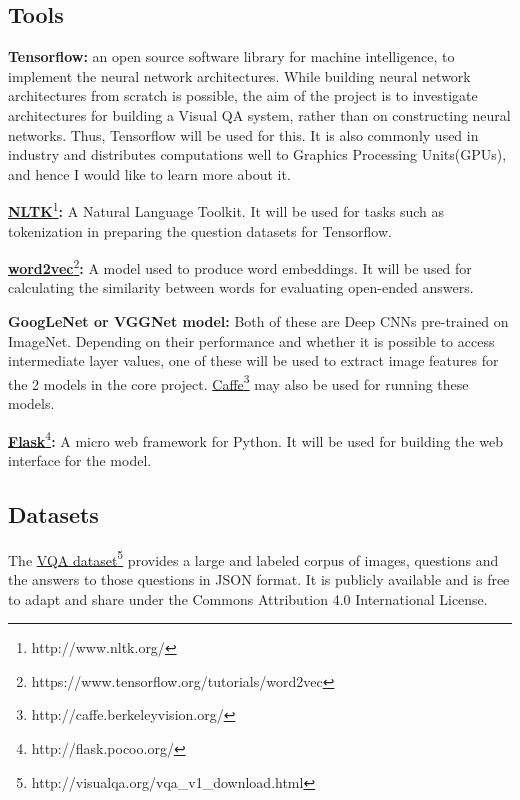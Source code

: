 \documentclass[12pt,a4paper,twoside]{article}
\begin{document}
\setlength{\parskip}{1em}

\subsection{Tools}\label{Tools}

\textbf{Tensorflow:} an open source software library for machine intelligence, to implement the neural network architectures. While building neural network architectures from scratch is possible, the aim of the project is to investigate architectures for building a Visual QA system, rather than on constructing neural networks. Thus, Tensorflow will be used for this. It is also commonly used in industry and distributes computations well to Graphics Processing Units(GPUs), and hence I would like to learn more about it. 

\href{http://www.nltk.org/}{\textbf{NLTK}}\footnote{http://www.nltk.org/}\textbf{:} A Natural Language Toolkit. It will be used for tasks such as tokenization in preparing the question datasets for Tensorflow.

\href{https://www.tensorflow.org/tutorials/word2vec}{\textbf{word2vec}}\footnote{https://www.tensorflow.org/tutorials/word2vec}\textbf{:} A model used to produce word embeddings. It will be used for calculating the similarity between words for evaluating open-ended answers.

\textbf{GoogLeNet or VGGNet model:} Both of these are Deep CNNs pre-trained on ImageNet\cite{CNN}. Depending on their performance and whether it is possible to access intermediate layer values, one of these will be used to extract image features for the 2 models in the core project. \href{http://caffe.berkeleyvision.org/}{Caffe}\footnote{http://caffe.berkeleyvision.org/} may also be used for running these models.

\href{http://flask.pocoo.org/}{\textbf{Flask}}\footnote{http://flask.pocoo.org/}\textbf{:} A micro web framework for Python. It will be used for building the web interface for the model.


\subsection{Datasets}

The \href{http://visualqa.org/vqa_v1_download.html}{VQA dataset}\footnote{http://visualqa.org/vqa\_v1\_download.html} provides a large and labeled corpus of images, questions and the answers to those questions in JSON format.
It is publicly available and is free to adapt and share under the Commons Attribution 4.0 International License.
\end{document}
